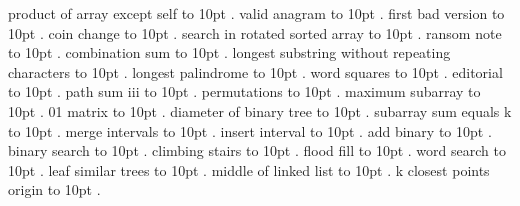 \smallskip
{} product of array except self \leaders\hbox to 10pt {\hss.\hss}  \hfill {}
\smallskip
{} valid anagram \leaders\hbox to 10pt {\hss.\hss}  \hfill {}
\smallskip
{} first bad version \leaders\hbox to 10pt {\hss.\hss}  \hfill {}
\smallskip
{} coin change \leaders\hbox to 10pt {\hss.\hss}  \hfill {}
\smallskip
{} search in rotated sorted array \leaders\hbox to 10pt {\hss.\hss}  \hfill {}
\smallskip
{} ransom note \leaders\hbox to 10pt {\hss.\hss}  \hfill {}
\smallskip
{} combination sum \leaders\hbox to 10pt {\hss.\hss}  \hfill {}
\smallskip
{} longest substring without repeating characters \leaders\hbox to 10pt {\hss.\hss}  \hfill {}
\smallskip
{} longest palindrome \leaders\hbox to 10pt {\hss.\hss}  \hfill {}
\smallskip
{} word squares \leaders\hbox to 10pt {\hss.\hss}  \hfill {}
\smallskip
\noindent editorial \leaders\hbox to 10pt {\hss.\hss}  \hfill {}
\smallskip
{} path sum iii \leaders\hbox to 10pt {\hss.\hss}  \hfill {}
\smallskip
{} permutations \leaders\hbox to 10pt {\hss.\hss}  \hfill {}
\smallskip
{} maximum subarray \leaders\hbox to 10pt {\hss.\hss}  \hfill {}
\smallskip
{} 01 matrix \leaders\hbox to 10pt {\hss.\hss}  \hfill {}
\smallskip
{} diameter of binary tree \leaders\hbox to 10pt {\hss.\hss}  \hfill {}
\smallskip
{} subarray sum equals k \leaders\hbox to 10pt {\hss.\hss}  \hfill {}
\smallskip
{} merge intervals \leaders\hbox to 10pt {\hss.\hss}  \hfill {}
\smallskip
{} insert interval \leaders\hbox to 10pt {\hss.\hss}  \hfill {}
\smallskip
{} add binary \leaders\hbox to 10pt {\hss.\hss}  \hfill {}
\smallskip
{} binary search \leaders\hbox to 10pt {\hss.\hss}  \hfill {}
\smallskip
{} climbing stairs \leaders\hbox to 10pt {\hss.\hss}  \hfill {}
\smallskip
{} flood fill \leaders\hbox to 10pt {\hss.\hss}  \hfill {}
\smallskip
{} word search \leaders\hbox to 10pt {\hss.\hss}  \hfill {}
\smallskip
{} leaf similar trees \leaders\hbox to 10pt {\hss.\hss}  \hfill {}
\smallskip
{} middle of linked list \leaders\hbox to 10pt {\hss.\hss}  \hfill {}
\smallskip
{} k closest points origin \leaders\hbox to 10pt {\hss.\hss}  \hfill {}
